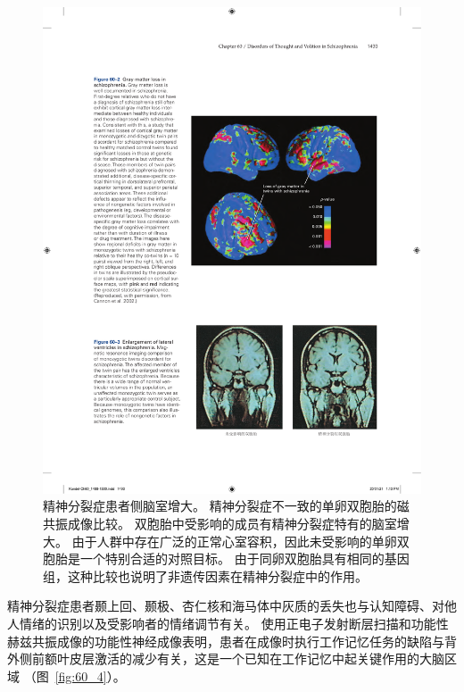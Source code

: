 \begin{figure}[htbp]
	\centering
	\includegraphics[width=0.85\linewidth]{chap60/fig_60_3}
	\caption{精神分裂症患者侧脑室增大。
		精神分裂症不一致的单卵双胞胎的磁共振成像比较。
		双胞胎中受影响的成员有精神分裂症特有的脑室增大。
		由于人群中存在广泛的正常心室容积，因此未受影响的单卵双胞胎是一个特别合适的对照目标。
		由于同卵双胞胎具有相同的基因组，这种比较也说明了非遗传因素在精神分裂症中的作用。}
	\label{fig:60_3}
\end{figure}


精神分裂症患者颞上回、颞极、杏仁核和海马体中灰质的丢失也与认知障碍、对他人情绪的识别以及受影响者的情绪调节有关。
使用正电子发射断层扫描和功能性赫兹共振成像的功能性神经成像表明，患者在成像时执行工作记忆任务的缺陷与背外侧前额叶皮层激活的减少有关，这是一个已知在工作记忆中起关键作用的大脑区域 （图~\ref{fig:60_4}）。


